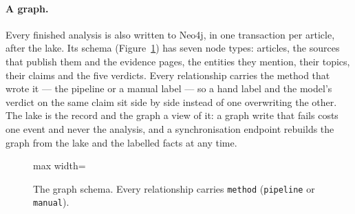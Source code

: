 \paragraph{A graph.} Every finished analysis is also written to Neo4j,
in one transaction per article, after the lake. Its schema
(Figure~\ref{fig:graph-schema}) has seven node types: articles, the
sources that publish them and the evidence pages, the entities they
mention, their topics, their claims and the five verdicts. Every
relationship carries the method that wrote it --- the pipeline or a
manual label --- so a hand label and the model's verdict on the same
claim sit side by side instead of one overwriting the other. The lake
is the record and the graph a view of it: a graph write that fails
costs one event and never the analysis, and a synchronisation endpoint
rebuilds the graph from the lake and the labelled facts at any time.

\begin{figure}[ht]
\centering
\begin{adjustbox}{max width=\linewidth}
\end{adjustbox}
\caption{The graph schema. Every relationship carries
\texttt{method} (\texttt{pipeline} or \texttt{manual}).}
\label{fig:graph-schema}
\end{figure}
